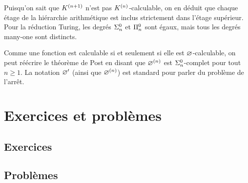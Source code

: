 \begin{corollary}
  Puisqu'on sait que $K^{(n+1)}$ n'est pas $K^{(n)}$-calculable, on en
  déduit que chaque étage de la hiérarchie arithmétique est inclus strictement
  dans l'étage supérieur. Pour la réduction Turing, les degrés $\Sigma^0_{n}$
  et $\Pi^0_{n}$ sont égaux, mais tous les degrés many-one sont distincts.
\end{corollary}

\begin{remark}
  Comme une fonction est calculable si et seulement si elle est
  $\varnothing$-calculable, on peut réécrire le théorème de Post en disant que
  $\varnothing^{(n)}$ est $\Sigma^0_{n}$-complet pour tout $n \geq 1$. La
  notation $\varnothing'$ (ainsi que $\varnothing^{(n)}$) est standard pour
  parler du problème de l'arrêt.
\end{remark}

\clearpage

\section{Exercices et problèmes}

\subsection{Exercices}

\clearpage

\subsection{Problèmes}
